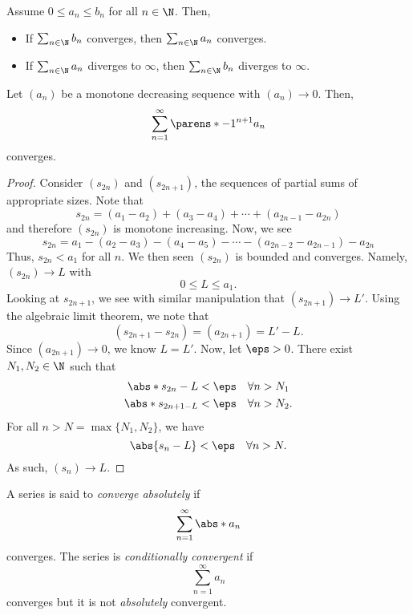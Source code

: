 \documentclass{article}
\begin{document}
\begin{prop} Assume $0 \le a_{n} \le b_{n}$ for all $n \in \N$. Then,
  \begin{itemize}
    \item If $\sum_{n \in \N} b_{n}$ converges, then $\sum_{n \in \N} a_{n}$ converges.
    \item If $\sum_{n \in \N} a_{n}$ diverges to $\infty$, then $\sum_{n \in \N} b_{n}$ diverges to $\infty$.
  \end{itemize}
\end{prop}

\begin{prop}
  Let $(a_{n})$ be a monotone decreasing sequence with $(a_{n}) \to 0$.
  Then,
  \[
    \sum_{n = 1}^{\infty}\parens*{-1}^{n + 1}a_{n}
  \]
  converges.
  \begin{proof}
    Consider $(s_{2n})$ and $(s_{2n + 1})$, the sequences of partial sums of appropriate sizes.
    Note that
    \[
      s_{2n} = (a_{1} - a_{2}) + (a_{3} - a_{4}) + \cdots + (a_{2n - 1} - a_{2n})
    \]
    and therefore $(s_{2n})$ is monotone increasing.
    Now, we see
    \[
      s_{2n} = a_{1} - (a_{2} - a_{3})  - (a_{4} - a_{5}) - \cdots - (a_{2n - 2} - a_{2n - 1}) - a_{2n}
    \]
    Thus, $s_{2n} < a_{1}$ for all $n$. We then seen $(s_{2n})$ is bounded and converges. Namely, $(s_{2n}) \to L$
    with
    \[
      0 \le L \le a_{1}.
    \]
    Looking at $s_{2n + 1}$, we see with similar manipulation that $(s_{2n + 1}) \to L'$.
    Using the algebraic limit theorem, we note that
    \[
      (s_{2n + 1} - s_{2n}) = (a_{2n + 1}) = L' - L.
    \]
    Since $(a_{2n + 1}) \to 0$, we know $L = L'$.
    Now, let $\eps > 0$. There exist $N_{1}, N_{2} \in \N$ such that
    \begin{align*}
      \abs*{s_{2n} - L} &< \eps \quad \forall n > N_{1}\\
      \abs*{s_{2n + 1 - L}} &< \eps \quad \forall n > N_{2}.
    \end{align*}
    For all $n > N = \max\{N_{1}, N_{2}\}$, we have
    \[
      \abs{s_{n} - L} < \eps \quad \forall n > N.
    \]
    As such, $(s_{n}) \to L$.
  \end{proof}
\end{prop}

\begin{defn}\label{defn:absolute-conditional-convergence}
  A series is said to \emph{converge absolutely} if
  \[
    \sum_{n = 1}^{\infty}\abs*{a_{n}}
  \]
  converges. The series is \emph{conditionally convergent} if
  \[
    \sum_{n = 1}^{\infty}a_{n}
  \]
  converges but it is not \emph{absolutely} convergent.
\end{defn}
\end{document}
